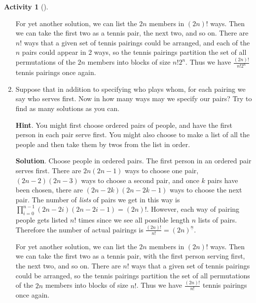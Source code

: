 \documentclass[10pt,]{book}
\theoremstyle{plain}
\theoremstyle{definition}
\theoremstyle{definition}
\theoremstyle{definition}
\newtheorem{activity}[project]{Activity}
\theoremstyle{definition}
\numberwithin{equation}{chapter}
\begin{document}
\begin{activity}[]
\begin{enumerate}[font=\bfseries,label=(\alph*),ref=\alph*]
\par
\hypertarget{p-680}{}%
For yet another solution, we can list the \(2n\) members in \((2n)!\) ways. Then we can take the first two as a tennis pair, the next two, and so on. There are \(n!\) ways that a given set of tennis pairings could be arranged, and each of the \(n\) pairs could appear in 2 ways, so the tennis pairings partition the set of all permutations of the \(2n\) members into blocks of size \(n!2^n\). Thus we have \(\frac{(2n)!}{n!2^n}\) tennis pairings once again.%
\item\label{task-77} \hypertarget{p-681}{}%
Suppose that in addition to specifying who plays whom, for each pairing we say who serves first.  Now in how many ways may we specify our pairs? Try to find as many solutions as you can.%
\par\smallskip%
\noindent\textbf{Hint}.\hypertarget{hint-45}{}\quad%
\hypertarget{p-682}{}%
You might first choose ordered pairs of people, and have the first person in each pair serve first. You might also choose to make a list of all the people and then take them by twos from the list in order.%
\par\smallskip%
\noindent\textbf{Solution}.\hypertarget{solution-62}{}\quad%
\hypertarget{p-683}{}%
Choose people in ordered pairs.  The first person in an ordered pair serves first.  There are \(2n(2n-1)\) ways to choose one pair, \((2n-2)(2n-3)\) ways to choose a second pair, and once \(k\) pairs have been chosen, there are \((2n-2k)(2n-2k-1)\) ways to choose the next pair.  The number of \emph{lists} of pairs we get in this way is \(\prod_{i=0}^{n-1} (2n-2i)(2n-2i-1) = (2n)!\). However, each way of pairing people gets listed \(n!\) times since we see all possible length \(n\) lists of pairs.  Therefore the number of actual pairings is \(\frac{(2n)!}{n!} = (2n)^{\underline{n}}\).%
\par
\hypertarget{p-684}{}%
For yet another solution, we can list the \(2n\) members in \((2n)!\) ways. Then we can take the first two as a tennis pair, with the first person serving first, the next two, and so on. There are \(n!\) ways that a given set of tennis pairings could be arranged, so the tennis pairings partition the set of all permutations of the \(2n\) members into blocks of size \(n!\). Thus we have \(\frac{(2n)!}{n!}\) tennis pairings once again.%
\end{enumerate}
\end{activity}
\end{document}
